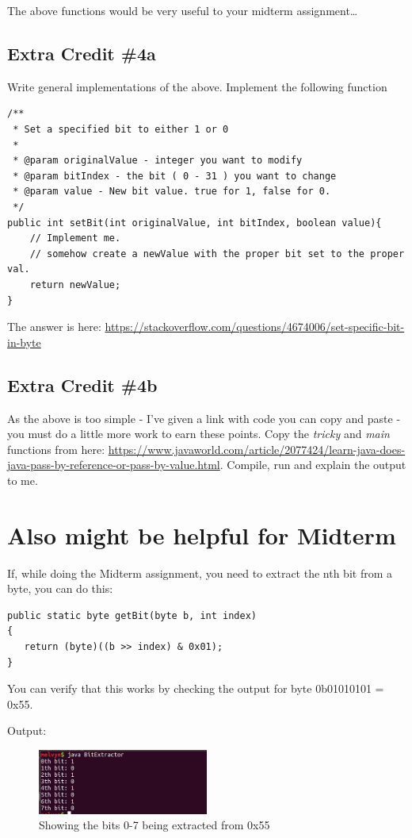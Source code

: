 \documentclass[12pt]{article}
\begin{document}
The above functions would be very useful to your midterm assignment\dots

\subsection{Extra Credit \#4a}
Write general implementations of the above. Implement the following function

\begin{lstlisting}
/**
 * Set a specified bit to either 1 or 0
 * 
 * @param originalValue - integer you want to modify
 * @param bitIndex - the bit ( 0 - 31 ) you want to change
 * @param value - New bit value. true for 1, false for 0. 
 */
public int setBit(int originalValue, int bitIndex, boolean value){
	// Implement me.
	// somehow create a newValue with the proper bit set to the proper val.
	return newValue;
}
\end{lstlisting}

The answer is here:
\url{https://stackoverflow.com/questions/4674006/set-specific-bit-in-byte}

\subsection{Extra Credit \#4b}
As the above is too simple - I've given a link with code you can copy and paste - you must do a little more work to earn these points. Copy the \textit{tricky} and \textit{main} functions from here: \url{https://www.javaworld.com/article/2077424/learn-java-does-java-pass-by-reference-or-pass-by-value.html}. Compile, run and explain the output to me.

\section{Also might be helpful for Midterm}

If, while doing the Midterm assignment, you need to extract the nth bit from a byte, you can do this:

\begin{lstlisting}
public static byte getBit(byte b, int index)
{
   return (byte)((b >> index) & 0x01);
}
\end{lstlisting}

You can verify that this works by checking the output for byte 0b01010101 = 0x55.



Output:

\begin{figure}[h]
  \centering
    \includegraphics[width=0.5\textwidth]{bitExtractor.png}
  \caption{Showing the bits 0-7 being extracted from 0x55}
\end{figure}
\end{document}
